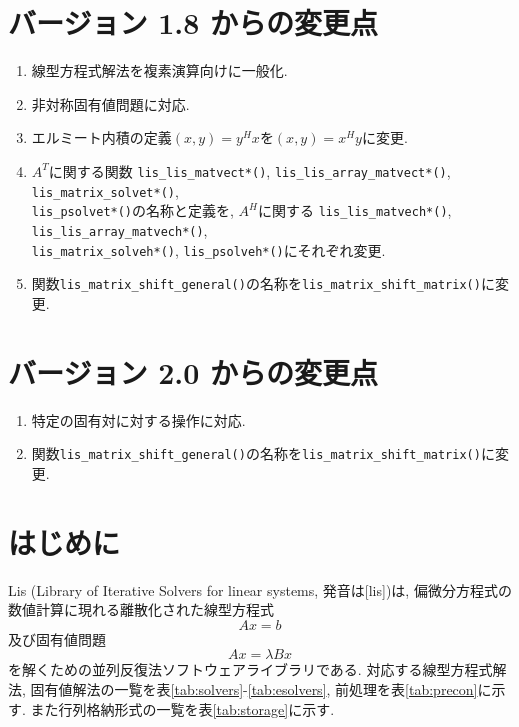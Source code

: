 \documentclass[a4paper]{jarticle}
\begin{document}
\section*{バージョン 1.8 からの変更点}
\begin{enumerate}
\item 線型方程式解法を複素演算向けに一般化.
\item 非対称固有値問題に対応.
\item エルミート内積の定義$(x,y)=y^{H}x$を$(x,y)=x^{H}y$に変更.
\item $A^T$に関する関数
      {\tt lis\_lis\_matvect*()}, 
      {\tt lis\_lis\_array\_matvect*()}, 
      {\tt lis\_matrix\_solvet*()}, \\
      {\tt lis\_psolvet*()}の名称と定義を, $A^H$に関する
      {\tt lis\_lis\_matvech*()}, 
      {\tt lis\_lis\_array\_matvech*()}, \\  
      {\tt lis\_matrix\_solveh*()}, 
      {\tt lis\_psolveh*()}にそれぞれ変更.
\item 関数{\tt lis\_matrix\_shift\_general()}の名称を{\tt lis\_matrix\_shift\_matrix()}に変更.
\end{enumerate}

\section*{バージョン 2.0 からの変更点}
\begin{enumerate}
\item 特定の固有対に対する操作に対応.
\item 関数{\tt lis\_matrix\_shift\_general()}の名称を{\tt lis\_matrix\_shift\_matrix()}に変更.
\end{enumerate}

\newpage
\section{はじめに}
Lis (Library of Iterative Solvers for linear systems, 発音は[lis])は, 
偏微分方程式の数値計算に現れる離散化された線型方程式 
\[
Ax = b
\]
及び固有値問題
\[
Ax = \lambda Bx
\]
を解くための並列反復法ソフトウェアライブラリである\cite{nishida1}. 
対応する線型方程式解法, 固有値解法の一覧を表\ref{tab:solvers}-\ref{tab:esolvers}, 
前処理を表\ref{tab:precon}に示す. 
また行列格納形式の一覧を表\ref{tab:storage}に示す. 
\end{document}
